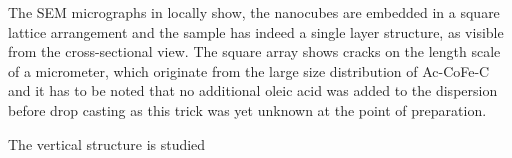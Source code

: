 \documentclass[\main/dresen_thesis.tex]{subfiles}
\begin{document}
  The SEM micrographs in  locally show, the nanocubes are embedded in a square lattice arrangement and the sample has indeed a single layer structure, as visible from the cross-sectional view.
  The square array shows cracks on the length scale of a micrometer, which originate from the large size distribution of Ac-CoFe-C and it has to be noted that no additional oleic acid was added to the dispersion before drop casting as this trick was yet unknown at the point of preparation.

  The vertical structure is studied 
\end{document}
